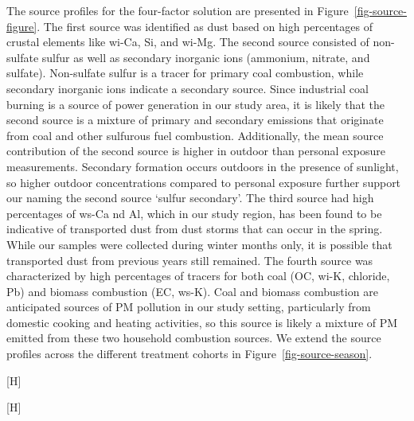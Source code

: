 \documentclass[
  letterpaper,
  DIV=11,
  numbers=noendperiod]{scrartcl}
\makeatletter
\renewenvironment{figure}%
   {\renewcommand\familydefault\sfdefault
    \@float{figure}}
   {\end@float}
\makeatother
\begin{document}
The source profiles for the four-factor solution are presented in
Figure~\ref{fig-source-figure}. The first source was identified as dust
based on high percentages of crustal elements like wi-Ca, Si, and wi-Mg.
The second source consisted of non-sulfate sulfur as well as secondary
inorganic ions (ammonium, nitrate, and sulfate). Non-sulfate sulfur is a
tracer for primary coal combustion, while secondary inorganic ions
indicate a secondary source. Since industrial coal burning is a source
of power generation in our study area, it is likely that the second
source is a mixture of primary and secondary emissions that originate
from coal and other sulfurous fuel combustion. Additionally, the mean
source contribution of the second source is higher in outdoor than
personal exposure measurements. Secondary formation occurs outdoors in
the presence of sunlight, so higher outdoor concentrations compared to
personal exposure further support our naming the second source `sulfur
secondary'. The third source had high percentages of ws-Ca nd Al, which
in our study region, has been found to be indicative of transported dust
from dust storms that can occur in the spring. While our samples were
collected during winter months only, it is possible that transported
dust from previous years still remained. The fourth source was
characterized by high percentages of tracers for both coal (OC, wi-K,
chloride, Pb) and biomass combustion (EC, ws-K). Coal and biomass
combustion are anticipated sources of PM pollution in our study setting,
particularly from domestic cooking and heating activities, so this
source is likely a mixture of PM emitted from these two household
combustion sources. We extend the source profiles across the different
treatment cohorts in Figure~\ref{fig-source-season}.

\begin{figure}[H]


\caption{\label{fig-source-figure}Source profiles for the 4-factor PMF
solution to the sum of elements, ions, elemental carbon, and organic
carbon for outdoor and personal PM\textsubscript{2.5} exposure
measurements. The lines separate the major contributing species to each
source.}

\end{figure}%

\begin{figure}[H]


\caption{\label{fig-source-season}Arithmetic mean dispersion normalized
source contributions found from the 4-factor PMF solution for \textbf{A}
outdoor and \textbf{B} personal PM\textsubscript{2.5} exposure samples
by year the group received treatment.}

\end{figure}%
\end{document}
